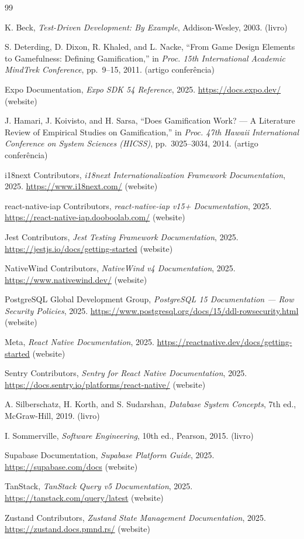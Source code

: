 \documentclass[12pt,a4paper]{report}
\renewcommand\_{\textunderscore\hspace{0pt}}
\begin{document}
\begin{thebibliography}{99}

  K. Beck, \textit{Test-Driven Development: By Example}, Addison-Wesley, 2003. (livro)

  S. Deterding, D. Dixon, R. Khaled, and L. Nacke, ``From Game Design Elements to Gamefulness: Defining Gamification,'' in \textit{Proc. 15th International Academic MindTrek Conference}, pp.~9--15, 2011. (artigo confer\^{e}ncia)

  Expo Documentation, \textit{Expo SDK 54 Reference}, 2025.
  \url{https://docs.expo.dev/} (website)

  J. Hamari, J. Koivisto, and H. Sarsa, ``Does Gamification Work? --- A Literature Review of Empirical Studies on Gamification,'' in \textit{Proc. 47th Hawaii International Conference on System Sciences (HICSS)}, pp.~3025--3034, 2014. (artigo confer\^{e}ncia)

  i18next Contributors, \textit{i18next Internationalization Framework Documentation}, 2025.
  \url{https://www.i18next.com/} (website)

  react-native-iap Contributors, \textit{react-native-iap v15+ Documentation}, 2025.
  \url{https://react-native-iap.dooboolab.com/} (website)

  Jest Contributors, \textit{Jest Testing Framework Documentation}, 2025.
  \url{https://jestjs.io/docs/getting-started} (website)

  NativeWind Contributors, \textit{NativeWind v4 Documentation}, 2025.
  \url{https://www.nativewind.dev/} (website)

  PostgreSQL Global Development Group, \textit{PostgreSQL 15 Documentation --- Row Security Policies}, 2025.
  \url{https://www.postgresql.org/docs/15/ddl-rowsecurity.html} (website)

  Meta, \textit{React Native Documentation}, 2025.
  \url{https://reactnative.dev/docs/getting-started} (website)

  Sentry Contributors, \textit{Sentry for React Native Documentation}, 2025.
  \url{https://docs.sentry.io/platforms/react-native/} (website)

  A. Silberschatz, H. Korth, and S. Sudarshan, \textit{Database System Concepts}, 7th ed., McGraw-Hill, 2019. (livro)

  I. Sommerville, \textit{Software Engineering}, 10th ed., Pearson, 2015. (livro)

  Supabase Documentation, \textit{Supabase Platform Guide}, 2025.
  \url{https://supabase.com/docs} (website)

  TanStack, \textit{TanStack Query v5 Documentation}, 2025.
  \url{https://tanstack.com/query/latest} (website)

  Zustand Contributors, \textit{Zustand State Management Documentation}, 2025.
  \url{https://zustand.docs.pmnd.rs/} (website)

\end{thebibliography}
\end{document}

